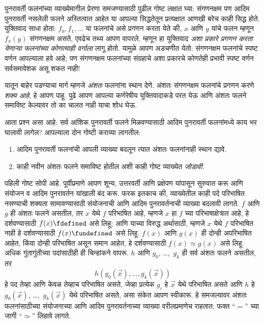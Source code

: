 पुनरावर्ती फलनांच्या व्याख्येमागील प्रेरणा समजण्यासाठी पुढील गोष्ट लक्षात
घ्या: संगणनक्षम पण आदिम पुनरावर्ती नसलेली फलने अस्तित्वात आहेत या आपल्या
सिद्धतेतून प्रत्यक्षात आणखी बरेच काही सिद्ध होते. युक्तिवाद साधा होता:
$f_0,f_1,\dots$ या फलनांचे असे प्रगणन करता येते की, $x$ आणि $y$ यांचे फलन
म्हणून $f_x(y)$ संगणनक्षम असते, एवढेच तथ्य आपण वापरले. म्हणून हा युक्तिवाद
\emph{अशा प्रकारे प्रगणन करता येणाऱ्या फलनांच्या कोणत्याही वर्गाला} लागू
होतो. यामुळे आपण अडचणीत येतो: संगणनक्षम फलनांचे स्पष्ट वर्णन आपल्याला हवे
आहे; पण संगणनक्षम फलनांच्या संग्रहाचे अशा प्रकारचे कोणतेही प्रभावी स्पष्ट
वर्णन सर्वसमावेशक असू शकत नाही!

यातून बाहेर पडण्याचा मार्ग म्हणजे \emph{अंशतः} फलनांना स्थान देणे. अंशतः
संगणनक्षम फलनांचे प्रगणन करणे \emph{शक्य आहे}, हे आपण पाहू.
 पुढे आपण आपल्या
कर्णरेषीय युक्तिवादाकडे परत येऊ आणि अंशतः फलने समाविष्ट केल्यावर तो का
चालत नाही याचा शोध घेऊ.

आता प्रश्न असा आहे: सर्व आंशिक पुनरावर्ती फलने मिळवण्यासाठी आदिम पुनरावर्ती
फलनांमध्ये काय भर घालावी लागेल? आपल्याला दोन गोष्टी कराव्या लागतील:
\begin{enumerate}
\item आदिम पुनरावर्ती फलनांची आपली व्याख्या बदलून त्यात अंशतः फलनांनाही
  स्थान द्यावे.
\item काही नवीन अंशतः फलने समाविष्ट होतील अशी काही गोष्ट व्याख्येत
  \emph{जोडावी}.
\end{enumerate}

पहिली गोष्ट सोपी आहे. पूर्वीप्रमाणे आपण शून्य, उत्तरवर्ती आणि प्रक्षेपण
यांपासून सुरुवात करू आणि संयोजन व आदिम पुनरावर्तन यांखाली बंद करू. फरक
इतकाच की, व्याख्येतील काही पदे परिभाषित नसण्याची शक्यता सामावण्यासाठी
संयोजनाची आणि आदिम पुनरावर्तनाची व्याख्या बदलावी लागते. $f$ आणि $g$ ही
अंशतः फलने असतील, तर $x$ येथे $f$ परिभाषित आहे, म्हणजे $x$ हा $f$ च्या
परिभाषाक्षेत्रात आहे, हे दर्शवण्यासाठी $f(x) \fdefined$ असे लिहू; आणि
याच्या विरुद्ध अर्थासाठी, म्हणजे $x$ येथे $f$ परिभाषित नाही हे दर्शवण्यासाठी
$f(x) \fundefined$ असे लिहू. $f(x)$ आणि $g(x)$ ही दोन्ही अपरिभाषित आहेत,
किंवा दोन्ही परिभाषित असून समान आहेत, हे दर्शवण्यासाठी $f(x) \simeq g(x)$
असे लिहू. अधिक गुंतागुंतीच्या पदांसाठीही ही चिन्हांकने वापरू. $h$ आणि
$g_0$, \dots,~$g_k$ ही सर्व अंशतः फलने असतील, तर
\[h(g_0(\vec x),\dots,g_k(\vec x))
\]
हे पद तेव्हा आणि केवळ तेव्हाच परिभाषित असते, जेव्हा प्रत्येक $g_i$ हे
$\vec x$ येथे परिभाषित असते आणि $h$ हे $g_0(\vec x)$, \dots,~$g_k(\vec x)$
येथे परिभाषित असते, असा संकेत आपण स्वीकारू. हे समजल्यावर अंशतः फलनांसाठीच्या
संयोजनाच्या आणि आदिम पुनरावर्तनाच्या व्याख्या वरीलप्रमाणेच राहतात; फक्त
``$=$'' च्या जागी ``$\simeq$'' लिहावे लागते.


